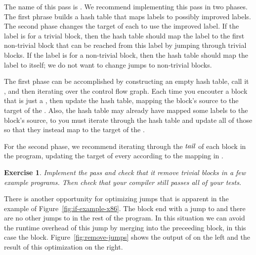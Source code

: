 \documentclass[11pt]{book}
\newtheorem{exercise}[theorem]{Exercise}
\begin{document}
The name of this pass is .  We recommend
implementing this pass in two phases. The first phrase builds a hash
table that maps labels to possibly improved labels. The second phase
changes the target of each  to use the improved label.  If
the label is for a trivial block, then the hash table should map the
label to the first non-trivial block that can be reached from this
label by jumping through trivial blocks.  If the label is for a
non-trivial block, then the hash table should map the label to itself;
we do not want to change jumps to non-trivial blocks.

The first phase can be accomplished by constructing an empty hash
table, call it , and then iterating over the control
flow graph. Each time you encouter a block that is just a ,
then update the hash table, mapping the block's source to the target
of the . Also, the hash table may already have mapped some
labels to the block's source, to you must iterate through the hash
table and update all of those so that they instead map to the target
of the .

For the second phase, we recommend iterating through the $\mathit{tail}$ of
each block in the program, updating the target of every 
according to the mapping in .

\begin{exercise}\normalfont
  Implement the  pass and check that it remove
  trivial blocks in a few example programs. Then check that your
  compiler still passes all of your tests.
\end{exercise}

There is another opportunity for optimizing jumps that is apparent in
the example of Figure~\ref{fig:if-example-x86}. The  block
end with a jump to  and there are no other jumps to
 in the rest of the program. In this situation we can
avoid the runtime overhead of this jump by merging 
into the preceeding block, in this case the  block.
Figure~\ref{fig:remove-jumps} shows the output of
 on the left and the result of this
optimization on the right.
\end{document}
